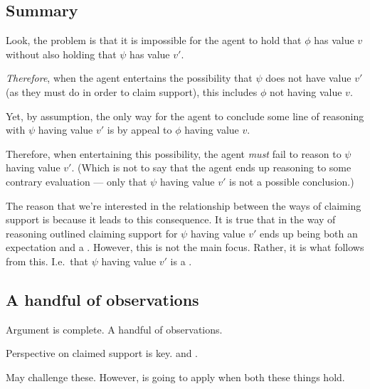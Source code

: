 \subsection{Summary}

\begin{note}[To summarise]
  Look, the problem is that it is impossible for the agent to hold that \(\phi\) has value \(v\) without also holding that \(\psi\) has value \(v'\).

  \emph{Therefore}, when the agent entertains the possibility that \(\psi\) does not have value \(v'\) (as they must do in order to claim support), this includes \(\phi\) not having value \(v\).

  Yet, by assumption, the only way for the agent to conclude some line of reasoning with \(\psi\) having value \(v'\) is by appeal to \(\phi\) having value \(v\).

  Therefore, when entertaining this possibility, the agent \emph{must} fail to reason to \(\psi\) having value \(v'\).
  (Which is not to say that the agent ends up reasoning to some contrary evaluation --- only that \(\psi\) having value \(v'\) is not a possible conclusion.)

  The reason that we're interested in the relationship between the ways of claiming support is because it leads to this consequence.
  It is true that in the way of reasoning outlined claiming support for \(\psi\) having value \(v'\) ends up being both an expectation and a \requ{}.
  However, this is not the main focus.
  Rather, it is what follows from this.
  I.e.\ that \(\psi\) having value \(v'\) is a \requ{}.
\end{note}

\newpage

\subsection*{A handful of observations}

\begin{note}
  Argument is complete.
  A handful of observations.
\end{note}

\begin{note}
  Perspective on claimed support is key.
  \nfcs{} and \eiS{}.

  May challenge these.
  However, \nI{} is going to apply when both these things hold.
\end{note}

